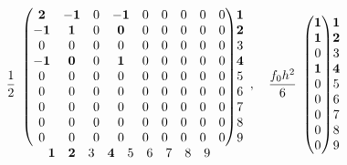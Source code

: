 \[\frac12\begin{array}{c@{}c}
\begin{pmatrix}
\mathbf2&\mathbf{-1}&0&\mathbf{-1}&0&0&0&0&0\\
\mathbf{-1}&\mathbf1&0&\mathbf0&0&0&0&0&0\\
0&0&0&0&0&0&0&0&0\\
\mathbf{-1}&\mathbf0&0&\mathbf1&0&0&0&0&0\\
0&0&0&0&0&0&0&0&0\\0&0&0&0&0&0&0&0&0\\0&0&0&0&0&0&0&0&0\\0&0&0&0&0&0&0&0&0\\0&0&0&0&0&0&0&0&0
\end{pmatrix}&\begin{matrix}\mathbf1\\\mathbf2\\3\\\mathbf4\\5\\6\\7\\8\\9\end{matrix}\\
\begin{matrix}\mathbf1&\mathbf2&3&\mathbf4&5&6&7&8&9\end{matrix}&
\end{array},\quad\frac{f_0h^2}{6}\begin{array}{c@{}c}
\begin{pmatrix}\mathbf1\\\mathbf1\\0\\\mathbf1\\0\\0\\0\\0\\0\end{pmatrix}&\begin{matrix}\mathbf1\\\mathbf2\\3\\\mathbf4\\5\\6\\7\\8\\9\end{matrix}
\end{array}\]
